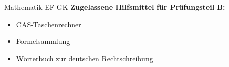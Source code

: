 \documentclass[lang=ngerman]{edoxarticle}
\begin{document}
\begin{exam}{Mathematik EF GK}
\vskip20pt
\textbf{Zugelassene Hilfsmittel für Prüfungsteil B:}
\begin{itemize}
\item CAS-Taschenrechner
\item Formelsammlung
\item Wörterbuch zur deutschen Rechtschreibung
\end{itemize}

\end{exam}
\end{document}
